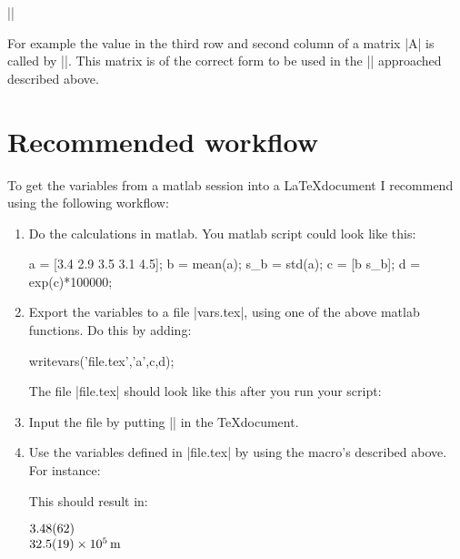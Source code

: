 \documentclass[a4paper,10pt]{article}
\newcommand\argu[1]{{\color{black}$\langle$\textit{#1}$\rangle$}}
\begin{document}
|\Mval{|\argu{matrix}|(|\argu{i}|,|\argu{j}|)}|

For example the value in the third row and second column of a matrix |A| is called by ||. This matrix is of the correct form to be used in the |\preparematrix| approached described above.


\section{Recommended workflow}
To get the variables from a matlab session into a \LaTeX document I recommend using the following workflow:
\begin{enumerate}
	\item Do the calculations in matlab. You matlab script could look like this:
\begin{center}
	\begin{matlabcode}
		a = [3.4 2.9 3.5 3.1 4.5];
		b = mean(a);
		s_b = std(a);
		c = [b s_b];
		d = exp(c)*100000;
	\end{matlabcode}
\end{center}
	\item Export the variables to a file |vars.tex|, using one of the above matlab functions. Do this by adding:
\begin{center}
\begin{matlabcode}
	 writevars('file.tex','a',c,d);
\end{matlabcode}
\end{center}
The file |file.tex| should look like this after you run your script:
\begin{center}
\begin{texcode}
\end{texcode}
\end{center}
	\item Input the file by putting || in the \TeX document.
	\item Use the variables defined in |file.tex| by using the macro's described above. For instance:
\begin{center}
\begin{texcode}
		
\end{texcode}
\end{center}

This should result in:

	\begin{minipage}[t]{\textwidth}
	$\SI{3.48+-0.62}{}$\\
	$\SI{32.5+-1.9e5}{\metre}$
	\end{minipage}

\end{enumerate}
\end{document}
